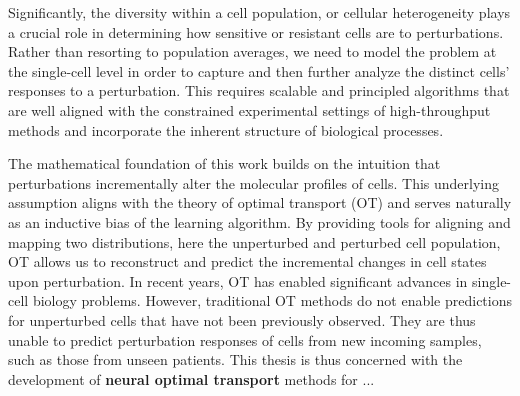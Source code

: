 Significantly, the diversity within a cell population, or cellular heterogeneity plays a crucial role in determining how sensitive or resistant cells are to perturbations.
Rather than resorting to population averages, we need to model the problem at the single-cell level in order to capture and then further analyze the distinct cells' responses to a perturbation. This requires scalable and principled algorithms that are well aligned with the constrained experimental settings of high-throughput methods and incorporate the inherent structure of biological processes.

The mathematical foundation of this work builds on the intuition that perturbations incrementally alter the molecular profiles of cells. This underlying assumption aligns with the theory of optimal transport (OT) and serves naturally as an inductive bias of the learning algorithm. By providing tools for aligning and mapping two distributions, here the unperturbed and perturbed cell population, OT allows us to reconstruct and predict the incremental changes in cell states upon perturbation. 
In recent years, OT has enabled significant advances in single-cell biology problems. However, traditional OT methods do not enable predictions for unperturbed cells that have not been previously observed.
They are thus unable to predict perturbation responses of cells from new incoming samples, such as those from unseen patients. 
This thesis is thus concerned with the development of \textbf{neural optimal transport} methods for ...

